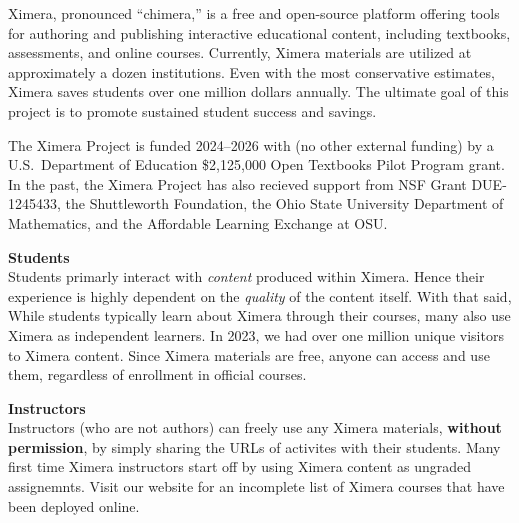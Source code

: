 \documentclass{article}
\begin{document}
\pagestyle{title}
\begin{multicols}{2}
    Ximera, pronounced ``chimera,'' is a free and
    open-source platform offering tools for authoring and publishing
    interactive educational content, including textbooks, assessments, and
    online
    courses. Currently, Ximera materials are utilized at approximately a dozen
    institutions. Even with the most conservative estimates, Ximera saves
    students
    over one million dollars annually. The ultimate goal of this project is to
    promote sustained student success and savings.

    The Ximera Project is funded 2024--2026 with (no other external funding) by
    a U.S.\ Department of Education \$2,125,000
    Open Textbooks Pilot Program grant. In the past, the Ximera Project has
    also recieved support from NSF Grant
    DUE-1245433, the Shuttleworth Foundation, the Ohio State University
    Department of Mathematics, and the Affordable Learning Exchange at OSU.

    \begin{xframe}
        {\sffamily\bfseries Students}\\
        Students primarly interact with \textit{content} produced within
        Ximera. Hence their experience is highly dependent on the
        \textit{quality} of
        the content itself. With that said,
        While students typically learn about Ximera through their courses, many
        also use Ximera as independent learners. In 2023, we had over one
        million unique visitors to Ximera content. Since Ximera materials are
        free,
        anyone can access and use them, regardless of enrollment in official
        courses.
    \end{xframe}

    \begin{xframe}
        {\sffamily\bfseries Instructors}\\
        Instructors (who are not authors) can freely use any Ximera materials,
        \textbf{without permission}, by simply sharing the URLs of activites
        with their students. Many first time Ximera instructors start off by
        using Ximera content as
        ungraded assignemnts. Visit our website for an incomplete list of
        Ximera courses that have been deployed online.
    \end{xframe}


\end{multicols}
\end{document}
